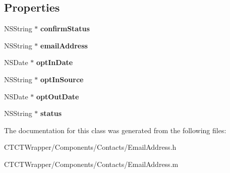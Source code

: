 \subsection*{Properties}
\begin{DoxyCompactItemize}
\item 
\hypertarget{interface_email_address_aff92694cc4918ee4af67f9616520e75e}{N\-S\-String $\ast$ {\bfseries confirm\-Status}}\label{interface_email_address_aff92694cc4918ee4af67f9616520e75e}

\item 
\hypertarget{interface_email_address_affb38a74f6786b977661b59175bbd97c}{N\-S\-String $\ast$ {\bfseries email\-Address}}\label{interface_email_address_affb38a74f6786b977661b59175bbd97c}

\item 
\hypertarget{interface_email_address_a3bc52839a90b8a359b63938c7d07562a}{N\-S\-Date $\ast$ {\bfseries opt\-In\-Date}}\label{interface_email_address_a3bc52839a90b8a359b63938c7d07562a}

\item 
\hypertarget{interface_email_address_ad0d4ec3ee2087e6d87adb83d5f061326}{N\-S\-String $\ast$ {\bfseries opt\-In\-Source}}\label{interface_email_address_ad0d4ec3ee2087e6d87adb83d5f061326}

\item 
\hypertarget{interface_email_address_abc600398b927212d6c16f8f7414cc7c1}{N\-S\-Date $\ast$ {\bfseries opt\-Out\-Date}}\label{interface_email_address_abc600398b927212d6c16f8f7414cc7c1}

\item 
\hypertarget{interface_email_address_a3e1b2bf02d88d5cac97fceafc0f9901e}{N\-S\-String $\ast$ {\bfseries status}}\label{interface_email_address_a3e1b2bf02d88d5cac97fceafc0f9901e}

\end{DoxyCompactItemize}


The documentation for this class was generated from the following files\-:\begin{DoxyCompactItemize}
\item 
C\-T\-C\-T\-Wrapper/\-Components/\-Contacts/Email\-Address.\-h\item 
C\-T\-C\-T\-Wrapper/\-Components/\-Contacts/Email\-Address.\-m\end{DoxyCompactItemize}
